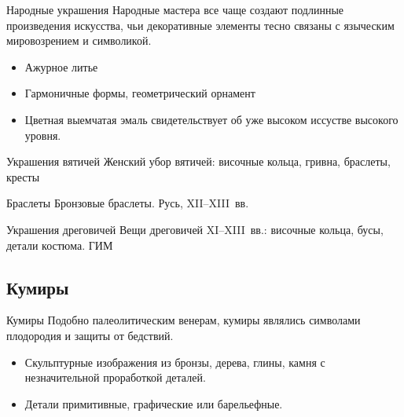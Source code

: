 \begin{frame}{Народные украшения}
  Народные мастера все чаще создают подлинные произведения искусства, чьи декоративные элементы тесно связаны с языческим мировозрением и символикой.
  \begin{itemize}
    \item Ажурное литье
    \item Гармоничные формы, геометрический орнамент
    \item Цветная выемчатая эмаль свидетельствует об уже высоком иссустве высокого уровня.

  \end{itemize}
\end{frame}

\begin{frame}{Украшения вятичей}
    {Женский убор вятичей: височные кольца, гривна, браслеты, кресты}
\end{frame}

\begin{frame}{Браслеты}
    {Бронзовые браслеты. Русь, XII--XIII~вв.}
\end{frame}

\begin{frame}{Украшения дреговичей}
    {Вещи дреговичей XI--XIII~вв.: височные кольца, бусы,
     детали костюма. ГИМ}
\end{frame}

\subsection{Кумиры}

\begin{frame}{Кумиры}
  Подобно палеолитическим венерам, кумиры являлись символами плодородия и защиты от бедствий. 
  \begin{itemize}
    \item Скульптурные изображения из бронзы, дерева, глины, камня с незначительной проработкой деталей.
    \item Детали примитивные, графические или барельефные.
  \end{itemize}
\end{frame}

